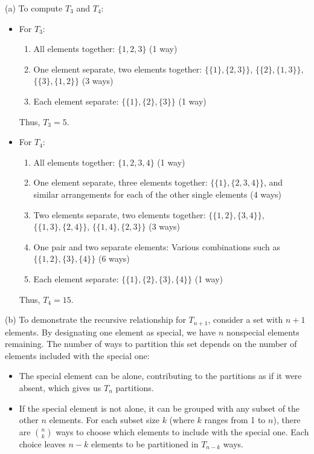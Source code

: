         \begin{solution}
            (a) To compute \( T_3 \) and \( T_4 \):
            \begin{itemize}
                \item For \( T_3 \):
                \begin{enumerate}
                    \item All elements together: \(\{1, 2, 3\}\) (1 way)
                    \item One element separate, two elements together: \(\{\{1\}, \{2, 3\}\}\), \(\{\{2\}, \{1, 3\}\}\), \(\{\{3\}, \{1, 2\}\}\) (3 ways)
                    \item Each element separate: \(\{\{1\}, \{2\}, \{3\}\}\) (1 way)
                \end{enumerate}
                Thus, \( T_3 = 5 \).
                \item For \( T_4 \):
                \begin{enumerate}
                    \item All elements together: \(\{1, 2, 3, 4\}\) (1 way)
                    \item One element separate, three elements together: \(\{\{1\}, \{2, 3, 4\}\}\), and similar arrangements for each of the other single elements (4 ways)
                    \item Two elements separate, two elements together: \(\{\{1, 2\}, \{3, 4\}\}\), \(\{\{1, 3\}, \{2, 4\}\}\), \(\{\{1, 4\}, \{2, 3\}\}\) (3 ways)
                    \item One pair and two separate elements: Various combinations such as \(\{\{1, 2\}, \{3\}, \{4\}\}\) (6 ways)
                    \item Each element separate: \(\{\{1\}, \{2\}, \{3\}, \{4\}\}\) (1 way)
                \end{enumerate}
                Thus, \( T_4 = 15 \).
            \end{itemize}
            
            (b) 
            To demonstrate the recursive relationship for \( T_{n+1} \), consider a set with \( n+1 \) elements. By designating one element as special, we have \( n \) nonspecial elements remaining. The number of ways to partition this set depends on the number of elements included with the special one:

            \begin{itemize}
                \item The special element can be alone, contributing to the partitions as if it were absent, which gives us \( T_n \) partitions.
                \item If the special element is not alone, it can be grouped with any subset of the other \( n \) elements. For each subset size \( k \) (where \( k \) ranges from 1 to \( n \)), there are \( \binom{n}{k} \) ways to choose which elements to include with the special one. Each choice leaves \( n-k \) elements to be partitioned in \( T_{n-k} \) ways.
            \end{itemize}


\end{solution}
